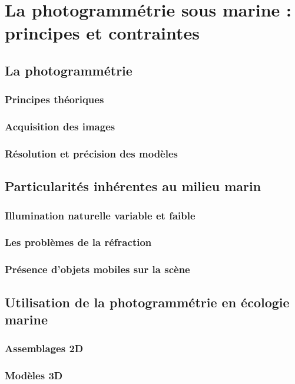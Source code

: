\section[La photogrammétrie]{La photogrammétrie sous marine : principes et contraintes}
\subsection{La photogrammétrie}
\subsubsection{Principes théoriques}
\subsubsection{Acquisition des images}
\subsubsection{Résolution et précision des modèles}

\subsection[Spécificités marines]{Particularités inhérentes au milieu marin}
\subsubsection{Illumination naturelle variable et faible}
\subsubsection{Les problèmes de la réfraction}
\subsubsection{Présence d'objets mobiles sur la scène}

\subsection[Photogrammétrie et écologie marine]{Utilisation de la photogrammétrie en écologie marine}
\subsubsection{Assemblages 2D}
\subsubsection{Modèles 3D}

